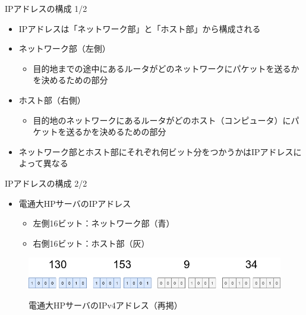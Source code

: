 \documentclass[12pt,aspectratio=169]{beamer}
\begin{document}
\begin{frame}{IPアドレスの構成 1/2}

  \begin{itemize}
    \item IPアドレスは「ネットワーク部」と「ホスト部」から構成される
    \item ネットワーク部（左側）
      \begin{itemize}
        \item 目的地までの途中にあるルータがどのネットワークにパケットを送るかを決めるための部分
      \end{itemize}
    \item ホスト部（右側）
      \begin{itemize}
        \item 目的地のネットワークにあるルータがどのホスト（コンピュータ）にパケットを送るかを決めるための部分
      \end{itemize}
    \item ネットワーク部とホスト部にそれぞれ何ビット分をつかうかはIPアドレスによって異なる

  \end{itemize}

\end{frame}


\begin{frame}{IPアドレスの構成 2/2}

  \begin{itemize}
    \item 電通大HPサーバのIPアドレス
    \begin{itemize}
      \item 左側16ビット：ネットワーク部（青）
      \item 右側16ビット：ホスト部（灰）
    \end{itemize}
  \end{itemize}

  \begin{figure}
    \centering
    \includegraphics[width=12cm,bb=0 0 741 91]{./figures/ipaddr.png}
    \label{fig:ipaddr_re}
    \caption{電通大HPサーバのIPv4アドレス（再掲）}
  \end{figure}

\end{frame}
\end{document}
